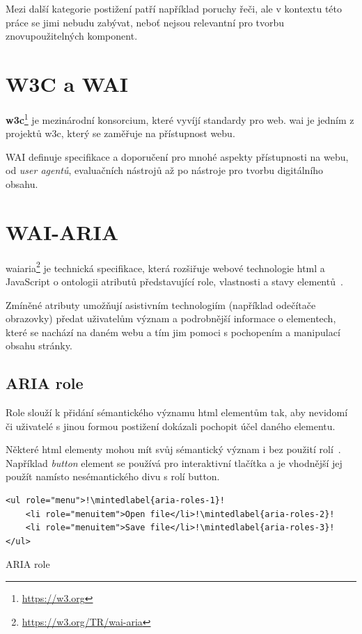 Mezi další kategorie postižení patří například poruchy řeči, ale v kontextu této práce se jimi nebudu zabývat, neboť nejsou relevantní pro tvorbu znovupoužitelných komponent.

\section{W3C a WAI}

\textbf{\gls{w3c}}\footnote{\url{https://w3.org}} je mezinárodní konsorcium, které vyvíjí standardy pro web.
\gls{wai} je jedním z projektů \gls{w3c}, který se zaměřuje na přístupnost webu.

WAI definuje specifikace a doporučení pro mnohé aspekty přístupnosti na webu, od \textit{user agentů}, evaluačních nástrojů až po nástroje pro tvorbu digitálního obsahu.

\section{WAI-ARIA}

\gls{waiaria}\footnote{\url{https://w3.org/TR/wai-aria}} je technická specifikace, která rozšiřuje webové technologie \gls{html} a JavaScript o ontologii atributů představující role, vlastnosti a stavy elementů~\cite{wai-aria}.

Zmíněné atributy umožňují asistivním technologiím (například odečítače obrazovky) předat uživatelům význam a podrobnější informace o elementech, které se nachází na daném webu a tím jim pomoci s pochopením a manipulací obsahu stránky.

\subsection{ARIA role}

Role slouží k přidání sémantického významu \gls{html} elementům tak, aby nevidomí či uživatelé s jinou formou postižení dokázali pochopit účel daného elementu.

Některé \gls{html} elementy mohou mít svůj sémantický význam i bez použití rolí~\cite{wai-implicit-semantics}.
Například \textit{button} element se používá pro interaktivní tlačítka a je vhodnější jej použít namísto nesémantického divu s rolí button.

\clearpage

\begin{listing}[!ht]
    \begin{verbatim}
<ul role="menu">!\mintedlabel{aria-roles-1}!
    <li role="menuitem">Open file</li>!\mintedlabel{aria-roles-2}!
    <li role="menuitem">Save file</li>!\mintedlabel{aria-roles-3}!
</ul>
\end{verbatim}
    \caption{ARIA role}
    \label{aria-roles}
\end{listing}

